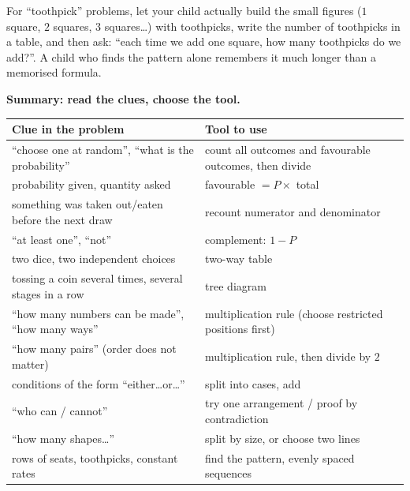 \begin{parentbox}
For ``toothpick'' problems, let your child actually build the small figures ($1$ square, $2$ squares, $3$ squares\ldots) with toothpicks, write the number of toothpicks in a table, and then ask: ``each time we add one square, how many toothpicks do we add?''. A child who finds the pattern alone remembers it much longer than a memorised formula.
\end{parentbox}

\begin{knowbox}
\textbf{Summary: read the clues, choose the tool.}\par\smallskip
\begin{tabularx}{\linewidth}{@{}>{\raggedright\arraybackslash}X>{\raggedright\arraybackslash}X@{}}
\textbf{Clue in the problem} & \textbf{Tool to use}\\ \hline
``choose one at random'', ``what is the probability'' & count all outcomes and favourable outcomes, then divide\\
probability given, quantity asked & favourable $=P\times$ total\\
something was taken out/eaten before the next draw & recount numerator and denominator\\
``at least one'', ``not'' & complement: $1-P$\\
two dice, two independent choices & two-way table\\
tossing a coin several times, several stages in a row & tree diagram\\
``how many numbers can be made'', ``how many ways'' & multiplication rule (choose restricted positions first)\\
``how many pairs'' (order does not matter) & multiplication rule, then divide by $2$\\
conditions of the form ``either\ldots or\ldots'' & split into cases, add\\
``who can / cannot'' & try one arrangement / proof by contradiction\\
``how many shapes\ldots'' & split by size, or choose two lines\\
rows of seats, toothpicks, constant rates & find the pattern, evenly spaced sequences\\
\end{tabularx}
\end{knowbox}

